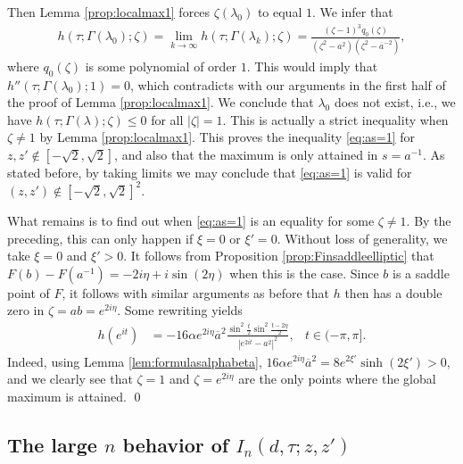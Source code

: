 \documentclass[%
 jmp,
cp,  %
 amsmath,amsthm,amssymb,%
 reprint,%
onecolumn]{revtex4-2}
\begin{document}
Then Lemma \ref{prop:localmax1} forces $\zeta(\lambda_0)$ to equal $1$. We infer that
\begin{align*} 
h(\tau;\Gamma(\lambda_0);\zeta) 
= \lim_{k\to\infty} h(\tau;\Gamma(\lambda_k);\zeta)  
= \frac{(\zeta-1)^3 q_0(\zeta)}{(\zeta^2-a^2) (\zeta^2 - \overline a^{-2})}, 
\end{align*}
where $q_0(\zeta)$ is some polynomial of order $1$. This would imply that $h''(\tau;\Gamma(\lambda_0);1)=0$, which contradicts with our arguments in the first half of the proof of Lemma \ref{prop:localmax1}. We conclude that $\lambda_0$ does not exist, i.e., we have $h(\tau;\Gamma(\lambda);\zeta)\leq 0$ for all $|\zeta|=1$. This is actually a strict inequality when $\zeta\neq 1$ by Lemma \ref{prop:localmax1}. This proves the inequality \eqref{eq:as=1} for $z,z'\not \in [-\sqrt 2,\sqrt 2]$, and also that the maximum is only attained in $s=a^{-1}$. As stated before, by taking limits we may conclude that \eqref{eq:as=1} is valid for $(z,z')\not\in [-\sqrt 2, \sqrt 2]^2$. 

What remains is to find out when \eqref{eq:as=1} is an equality for some $\zeta \neq 1$. By the preceding, this can only happen if $\xi=0$ or $\xi'=0$. Without loss of generality, we take $\xi=0$ and $\xi'>0$. It follows from Proposition \ref{prop:Finsaddleelliptic} that $F(b)-F(a^{-1}) = -2i\eta+i \sin(2\eta)$ when this is the case. Since $b$ is a saddle point of $F$, it follows with similar arguments as before that $h$ then has a double zero in $\zeta = a b = e^{2i\eta}$. Some rewriting yields 
\begin{align*}
h(e^{it}) &= -16 \alpha e^{2i\eta} \overline a^2 \frac{\sin^2 \frac{t}{2} \sin^2 \frac{t-2\eta}{2}}{|e^{2it}-a^2|^2}, & t\in (-\pi,\pi].
\end{align*}
Indeed, using Lemma \ref{lem:formulasalphabeta}, $16 \alpha e^{2i\eta} \overline a^2 = 8 e^{2\xi'} \sinh(2\xi')>0$, and we clearly see that $\zeta=1$ and $\zeta=e^{2i\eta}$ are the only points where the global maximum is attained. 
\qed


\subsection{The large $n$ behavior of $I_n(d,\tau;z,z')$}
\end{document}
